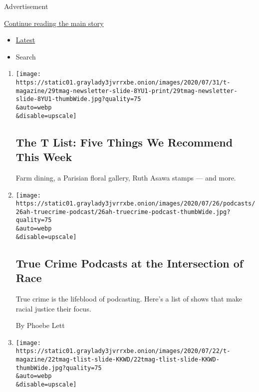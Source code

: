 Advertisement

\protect\hyperlink{after-mid1}{Continue reading the main story}

\begin{itemize}
\tightlist
\item
  \protect\hyperlink{stream-panel}{Latest}
\item
  Search
\end{itemize}

\begin{enumerate}
\def\labelenumi{\arabic{enumi}.}
\item
  \href{/2020/07/30/t-magazine/the-t-list-five-things-we-recommend-this-week.html}{}

  \texttt{[image: https://static01.graylady3jvrrxbe.onion/images/2020/07/31/t-magazine/29tmag-newsletter-slide-8YU1-print/29tmag-newsletter-slide-8YU1-thumbWide.jpg?quality=75\\\&auto=webp\\\&disable=upscale]}

  \hypertarget{the-t-list-five-things-we-recommend-this-week}{%
  \subsection{The T List: Five Things We Recommend This
  Week}\label{the-t-list-five-things-we-recommend-this-week}}

  Farm dining, a Parisian floral gallery, Ruth Asawa stamps --- and
  more.
\item
  \href{/2020/07/25/at-home/coronavirus-true-crime-podcasts-race.html}{}

  \texttt{[image: https://static01.graylady3jvrrxbe.onion/images/2020/07/26/podcasts/26ah-truecrime-podcast/26ah-truecrime-podcast-thumbWide.jpg?quality=75\\\&auto=webp\\\&disable=upscale]}

  \hypertarget{true-crime-podcasts-at-the-intersection-of-race}{%
  \subsection{True Crime Podcasts at the Intersection of
  Race}\label{true-crime-podcasts-at-the-intersection-of-race}}

  True crime is the lifeblood of podcasting. Here's a list of shows that
  make racial justice their focus.

  By Phoebe Lett
\item
  \href{/2020/07/23/t-magazine/puzzles-bug-spray-tlist.html}{}

  \texttt{[image: https://static01.graylady3jvrrxbe.onion/images/2020/07/22/t-magazine/22tmag-tlist-slide-KKWD/22tmag-tlist-slide-KKWD-thumbWide.jpg?quality=75\\\&auto=webp\\\&disable=upscale]}


\end{enumerate}
